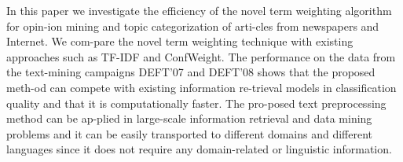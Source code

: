 In this paper we investigate the efficiency of the novel term weighting algorithm for opin-ion mining and topic categorization of arti-cles from newspapers and Internet. We com-pare the novel term weighting technique with existing approaches such as TF-IDF and ConfWeight. The performance on the data from the text-mining campaigns DEFT'07 and DEFT'08 shows that the proposed meth-od can compete with existing information re-trieval models in classification quality and that it is computationally faster. The pro-posed text preprocessing method can be ap-plied in large-scale information retrieval and data mining problems and it can be easily transported to different domains and different languages since it does not require any domain-related or linguistic information.
